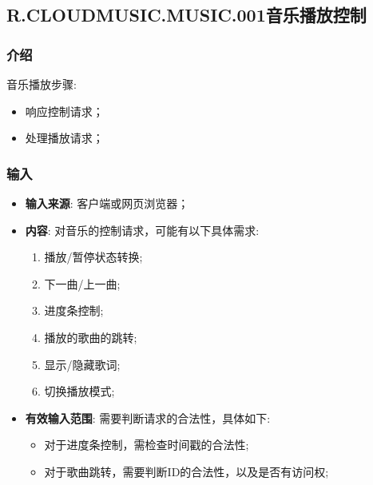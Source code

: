\subsection{R.CLOUDMUSIC.MUSIC.001音乐播放控制}
\subsubsection{介绍}
	音乐播放步骤: 
	\begin{itemize}
		\item 响应控制请求；
		\item 处理播放请求；
	\end{itemize}
\subsubsection{输入}
	\begin{itemize}
		\item \textbf{输入来源}: 客户端或网页浏览器；
		\item \textbf{内容}: 对音乐的控制请求，可能有以下具体需求: 
		\begin{enumerate}
			\item 播放/暂停状态转换;
			\item 下一曲/上一曲;
			\item 进度条控制;
			\item 播放的歌曲的跳转;
			\item 显示/隐藏歌词;
			\item 切换播放模式;
		\end{enumerate}
		\item \textbf{有效输入范围}: 需要判断请求的合法性，具体如下: 
		\begin{itemize}
			\item 对于进度条控制，需检查时间戳的合法性;
			\item 对于歌曲跳转，需要判断ID的合法性，以及是否有访问权;
		\end{itemize}
	\end{itemize}
